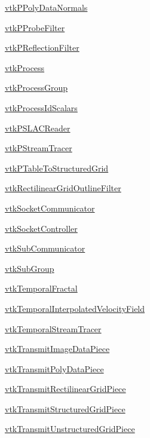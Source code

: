 \begin{DoxyItemize}
\item \hyperlink{vtkparallel_vtkppolydatanormals}{vtk\-P\-Poly\-Data\-Normals}  
\item \hyperlink{vtkparallel_vtkpprobefilter}{vtk\-P\-Probe\-Filter}  
\item \hyperlink{vtkparallel_vtkpreflectionfilter}{vtk\-P\-Reflection\-Filter}  
\item \hyperlink{vtkparallel_vtkprocess}{vtk\-Process}  
\item \hyperlink{vtkparallel_vtkprocessgroup}{vtk\-Process\-Group}  
\item \hyperlink{vtkparallel_vtkprocessidscalars}{vtk\-Process\-Id\-Scalars}  
\item \hyperlink{vtkparallel_vtkpslacreader}{vtk\-P\-S\-L\-A\-C\-Reader}  
\item \hyperlink{vtkparallel_vtkpstreamtracer}{vtk\-P\-Stream\-Tracer}  
\item \hyperlink{vtkparallel_vtkptabletostructuredgrid}{vtk\-P\-Table\-To\-Structured\-Grid}  
\item \hyperlink{vtkparallel_vtkrectilineargridoutlinefilter}{vtk\-Rectilinear\-Grid\-Outline\-Filter}  
\item \hyperlink{vtkparallel_vtksocketcommunicator}{vtk\-Socket\-Communicator}  
\item \hyperlink{vtkparallel_vtksocketcontroller}{vtk\-Socket\-Controller}  
\item \hyperlink{vtkparallel_vtksubcommunicator}{vtk\-Sub\-Communicator}  
\item \hyperlink{vtkparallel_vtksubgroup}{vtk\-Sub\-Group}  
\item \hyperlink{vtkparallel_vtktemporalfractal}{vtk\-Temporal\-Fractal}  
\item \hyperlink{vtkparallel_vtktemporalinterpolatedvelocityfield}{vtk\-Temporal\-Interpolated\-Velocity\-Field}  
\item \hyperlink{vtkparallel_vtktemporalstreamtracer}{vtk\-Temporal\-Stream\-Tracer}  
\item \hyperlink{vtkparallel_vtktransmitimagedatapiece}{vtk\-Transmit\-Image\-Data\-Piece}  
\item \hyperlink{vtkparallel_vtktransmitpolydatapiece}{vtk\-Transmit\-Poly\-Data\-Piece}  
\item \hyperlink{vtkparallel_vtktransmitrectilineargridpiece}{vtk\-Transmit\-Rectilinear\-Grid\-Piece}  
\item \hyperlink{vtkparallel_vtktransmitstructuredgridpiece}{vtk\-Transmit\-Structured\-Grid\-Piece}  
\item \hyperlink{vtkparallel_vtktransmitunstructuredgridpiece}{vtk\-Transmit\-Unstructured\-Grid\-Piece}  

\end{DoxyItemize}
